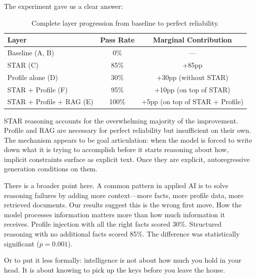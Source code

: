 \documentclass[11pt]{article}
\begin{document}
The experiment gave us a clear answer:

\begin{table}[H]
\centering
\begin{tabular}{lcc}
\toprule
\textbf{Layer} & \textbf{Pass Rate} & \textbf{Marginal Contribution} \\
\midrule
Baseline (A, B) & 0\% & --- \\
STAR (C) & 85\% & +85pp \\
Profile alone (D) & 30\% & +30pp (without STAR) \\
STAR + Profile (F) & 95\% & +10pp (on top of STAR) \\
STAR + Profile + RAG (E) & 100\% & +5pp (on top of STAR + Profile) \\
\bottomrule
\end{tabular}
\caption{Complete layer progression from baseline to perfect reliability.}
\label{tab:conclusion}
\end{table}

STAR reasoning accounts for the overwhelming majority of the improvement. Profile and RAG are necessary for perfect reliability but insufficient on their own. The mechanism appears to be goal articulation: when the model is forced to write down what it is trying to accomplish before it starts reasoning about how, implicit constraints surface as explicit text. Once they are explicit, autoregressive generation conditions on them.

There is a broader point here. A common pattern in applied AI is to solve reasoning failures by adding more context---more facts, more profile data, more retrieved documents. Our results suggest this is the wrong first move. How the model processes information matters more than how much information it receives. Profile injection with all the right facts scored 30\%. Structured reasoning with no additional facts scored 85\%. The difference was statistically significant ($p = 0.001$).

Or to put it less formally: intelligence is not about how much you hold in your head. It is about knowing to pick up the keys before you leave the house.
\end{document}
